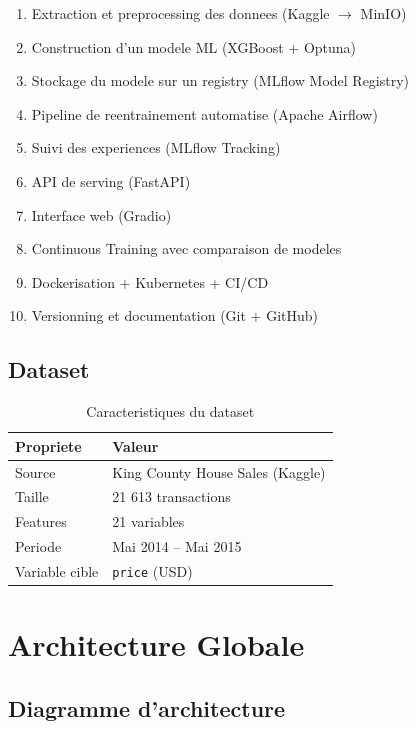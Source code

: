 \documentclass[a4paper,11pt]{article}
\begin{document}
\begin{enumerate}
    \item Extraction et preprocessing des donnees (Kaggle $\rightarrow$ MinIO)
    \item Construction d'un modele ML (XGBoost + Optuna)
    \item Stockage du modele sur un registry (MLflow Model Registry)
    \item Pipeline de reentrainement automatise (Apache Airflow)
    \item Suivi des experiences (MLflow Tracking)
    \item API de serving (FastAPI)
    \item Interface web (Gradio)
    \item Continuous Training avec comparaison de modeles
    \item Dockerisation + Kubernetes + CI/CD
    \item Versionning et documentation (Git + GitHub)
\end{enumerate}

\subsection{Dataset}

\begin{table}[h]
\centering
\begin{tabular}{ll}
\toprule
\textbf{Propriete} & \textbf{Valeur} \\
\midrule
Source & King County House Sales (Kaggle) \\
Taille & 21 613 transactions \\
Features & 21 variables \\
Periode & Mai 2014 -- Mai 2015 \\
Variable cible & \texttt{price} (USD) \\
\bottomrule
\end{tabular}
\caption{Caracteristiques du dataset}
\end{table}

\section{Architecture Globale}

\subsection{Diagramme d'architecture}
\end{document}
